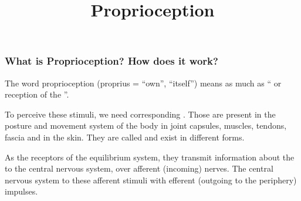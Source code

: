
\graphicspath{{images/}} %


\title{Proprioception} %



\begin{frame}
\titlepage %
\end{frame}

\begin{frame}
\frametitle{What is Proprioception? How does it work?}
\hypertarget{proprioception}{}
The word  proprioception (proprius = ``own'', ``itself'') means as much as `` or reception of the ''.

To perceive these stimuli, we need corresponding . Those are present in the posture and movement system of the body in joint capsules, muscles, tendons, fascia and in the skin. They are called  and exist in different forms. 

As the receptors of the equilibrium system, they transmit information about the  to the central nervous system, over afferent (incoming) nerves. The central nervous system  to these afferent stimuli with efferent (outgoing to the periphery) impulses.
\end{frame}






 